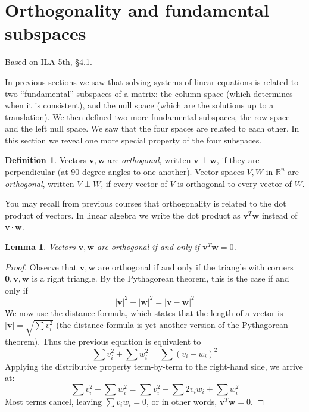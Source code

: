 \documentclass[11pt,oneside]{amsbook}
\newcommand{\R}{\mathbb R}
\theoremstyle{definition}
\theoremstyle{plain}
\newtheorem{lemma}[theorem]{Lemma}
\theoremstyle{definition}
\newtheorem{definition}[theorem]{Definition}
\theoremstyle{remark}
\numberwithin{equation}{section}
\numberwithin{figure}{section}
\begin{document}
\newpage
\section{Orthogonality and fundamental subspaces}

Based on ILA 5th, \S 4.1.

In previous sections we saw that solving systems of linear equations is related to two ``fundamental'' subspaces of a matrix: the column space (which determines when it is consistent), and the null space (which are the solutions up to a translation). We then defined two more fundamental subspaces, the row space and the left null space. We saw that the four spaces are related to each other. In this section we reveal one more special property of the four subspaces.

\begin{definition}
  Vectors $\mathbf{v},\mathbf{w}$ are \emph{orthogonal}, written $\mathbf{v}\perp\mathbf{w}$, if they are perpendicular (at 90 degree angles to one another). Vector spaces $V,W$ in $\R^n$ are \emph{orthogonal}, written $V\perp W$, if every vector of $V$ is orthogonal to every vector of $W$.
\end{definition}

You may recall from previous courses that orthogonality is related to the dot product of vectors. In linear algebra we write the dot product as $\mathbf{v}^T\mathbf{w}$ instead of $\mathbf{v}\cdot\mathbf{w}$.

\begin{lemma}
  Vectors $\mathbf{v},\mathbf{w}$ are orthogonal if and only if $\mathbf{v}^T\mathbf{w}=0$.
\end{lemma}

\begin{proof}
  Observe that $\mathbf{v},\mathbf{w}$ are orthogonal if and only if the triangle with corners $\mathbf{0},\mathbf{v},\mathbf{w}$ is a right triangle. By the Pythagorean theorem, this is the case if and only if
  \[|\mathbf{v}|^2+|\mathbf{w}|^2=|\mathbf{v-w}|^2
  \]
  We now use the distance formula, which states that the length of a vector is $|\mathbf{v}|=\sqrt{\sum v_i^2}$ (the distance formula is yet another version of the Pythagorean theorem). Thus the previous equation is equivalent to
  \[\sum v_i^2+\sum w_i^2=\sum(v_i-w_i)^2
  \]
  Applying the distributive property term-by-term to the right-hand side, we arrive at:
  \[\sum v_i^2+\sum w_i^2=\sum v_i^2-\sum 2v_iw_i+\sum w_i^2
  \]
  Most terms cancel, leaving $\sum v_iw_i=0$, or in other words, $\mathbf{v}^T\mathbf{w}=0$.
\end{proof}
\end{document}
